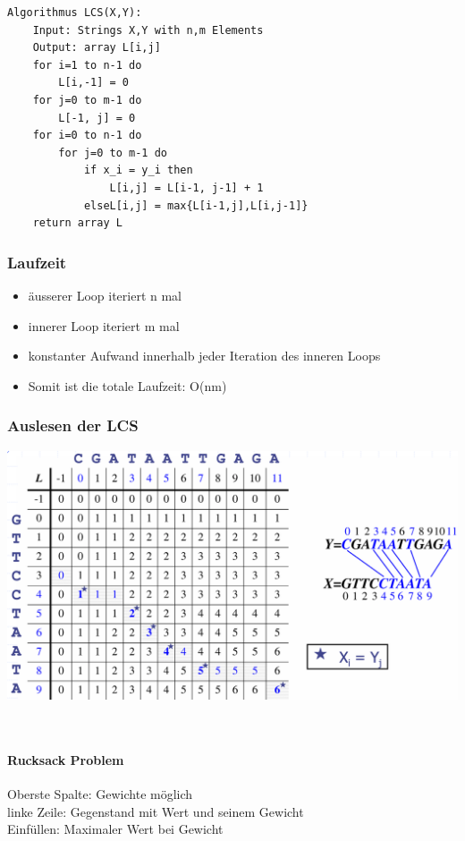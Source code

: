 \begin{lstlisting}
Algorithmus LCS(X,Y):
    Input: Strings X,Y with n,m Elements
    Output: array L[i,j]
    for i=1 to n-1 do
        L[i,-1] = 0
    for j=0 to m-1 do
        L[-1, j] = 0
    for i=0 to n-1 do
        for j=0 to m-1 do
            if x_i = y_i then
                L[i,j] = L[i-1, j-1] + 1
            elseL[i,j] = max{L[i-1,j],L[i,j-1]}
    return array L
\end{lstlisting}

\subsubsection{Laufzeit}
\begin{itemize}
    \item äusserer Loop iteriert n mal
    \item innerer Loop iteriert m mal
    \item konstanter Aufwand innerhalb jeder Iteration des inneren Loops
    \item Somit ist die totale Laufzeit: O(nm)
\end{itemize}

\subsubsection{Auslesen der LCS}
\begin{center}
    \includegraphics[scale=.27]{graphic/10 DynamicProgramming/Auslesen der LCS.png}
\end{center}

\vfill
$ $
\columnbreak
\paragraph{Rucksack Problem}

Oberste Spalte: Gewichte möglich\\
linke Zeile: Gegenstand mit Wert und seinem Gewicht\\
Einfüllen: Maximaler Wert bei Gewicht\\

